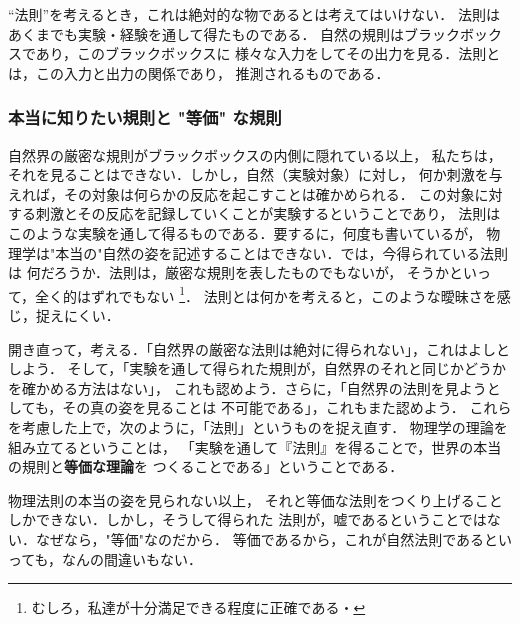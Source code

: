                 “法則”を考えるとき，これは絶対的な物であるとは考えてはいけない．
                法則はあくまでも実験・経験を通して得たものである．
                自然の規則はブラックボックスであり，このブラックボックスに
                様々な入力をしてその出力を見る．法則とは，この入力と出力の関係であり，
                推測されるものである．

            \subsubsection{本当に知りたい規則と "等価" な規則}
                自然界の厳密な規則がブラックボックスの内側に隠れている以上，
                私たちは，それを見ることはできない．しかし，自然（実験対象）に対し，
                何か刺激を与えれば，その対象は何らかの反応を起こすことは確かめられる．
                この対象に対する刺激とその反応を記録していくことが実験するということであり，
                法則はこのような実験を通して得るものである．要するに，何度も書いているが，
                物理学は"本当の"自然の姿を記述することはできない．では，今得られている法則は
                何だろうか．法則は，厳密な規則を表したものでもないが，
                そうかといって，全く的はずれでもない
                    \footnote{
                        むしろ，私達が十分満足できる程度に正確である・
                    }．
                法則とは何かを考えると，このような曖昧さを感じ，捉えにくい．

                開き直って，考える．「自然界の厳密な法則は絶対に得られない」，これはよしとしよう．
                そして，「実験を通して得られた規則が，自然界のそれと同じかどうかを確かめる方法はない」，
                これも認めよう．さらに，「自然界の法則を見ようとしても，その真の姿を見ることは
                不可能である」，これもまた認めよう．
                これらを考慮した上で，次のように，「法則」というものを捉え直す．
                物理学の理論を組み立てるということは，
                「実験を通して『法則』を得ることで，世界の本当の規則と\textbf{等価な理論}を
                つくることである」ということである．

                物理法則の本当の姿を見られない以上，
                それと等価な法則をつくり上げることしかできない．しかし，そうして得られた
                法則が，嘘であるということではない．なぜなら，"等価"なのだから．
                等価であるから，これが自然法則であるといっても，なんの間違いもない．


